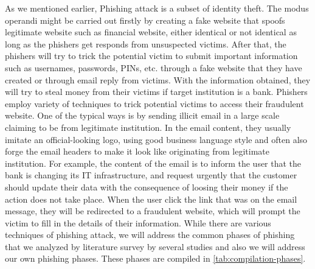 As we mentioned earlier, Phishing attack is a subset of identity theft.
The modus operandi might be carried out firstly by creating a fake
website that spoofs legitimate website such as financial website,
either identical or not identical as long as the phishers get responds
from unsuspected victims. After that, the phishers will try to trick
the potential victim to submit important information such as usernames,
passwords, PINs, etc. through a fake website that they have created
or through email reply from victims. With the information obtained,
they will try to steal money from their victims if target institution
is a bank. Phishers employ variety of techniques to trick potential
victims to access their fraudulent website. One of the typical ways
is by sending illicit email in a large scale claiming to be from legitimate
institution. In the email content, they usually imitate an official-looking
logo, using good business language style and often also forge the
email headers to make it look like originating from legitimate institution.
For example, the content of the email is to inform the user that the
bank is changing its IT infrastructure, and request urgently that
the customer should update their data with the consequence of loosing
their money if the action does not take place. When the user click
the link that was on the email message, they will be redirected to
a fraudulent website, which will prompt the victim to fill in the
details of their information. While there are various techniques of
phishing attack, we will address the common phases of phishing that
we analyzed by literature survey by several studies and also we will
address our own phishing phases. These phases are compiled in \autoref{tab:compilation-phases}.

